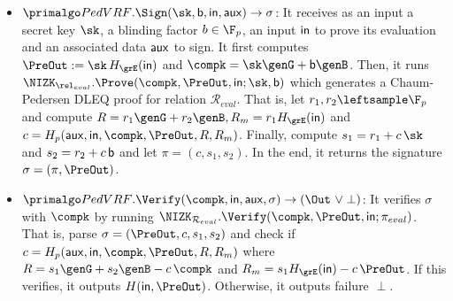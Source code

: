 \begin{itemize}
	\item $\PedVRF.\Sign(\sk,\openpk,\msg,\aux) \rightarrow \sigma$: It receives as an input a secret key $ \sk $, a blinding factor $ b \in \F_p $, an input $ \mathsf{in} $ to prove its evaluation and an associated data $ \mathsf{aux} $ to sign.
	It first computes $\PreOut := \sk \, H_{\grE}(\msg)$ and $ \compk = \sk \genG + \openpk\genB $. Then, it runs $\NIZK_{\rel_{eval}}.\Prove(\compk, \PreOut, \msg;\sk,\openpk)  $ which generates a Chaum-Pedersen DLEQ proof
	for relation $\mathcal{R}_{eval}$. That is,
	let $r_1,r_2 \leftsample \F_p$
	and compute $R = r_1 \genG + r_2 \genB, R_m = r_1 H_{\grE}(\msg) $ and $c = H_p(\aux,\msg,\compk,\PreOut,R,R_m)$. Finally, compute $s_1 = r_1 + c \, \sk$ and $s_2 = r_2 + c \, \mathsf{b}$ and let $ \pi = (c,s_1,s_2) $.
	In the end, it returns the signature $\sigma = (\pi, \PreOut) $.
	
	\item $\PedVRF.\Verify(\compk,\msg,\aux,\sigma) \rightarrow (\Out \ \vee \perp)$: 
	It verifies $ \sigma $ with  $ \compk $ by running  $ \NIZK_{\mathcal{R}_{eval}}.\Verify(\compk,\PreOut,\msg; \pi_{eval} ) $.
	That is,
	parse $\sigma = (\PreOut,c,s_1,s_2) $ and check if  
	$c = H_p(\aux,\msg,\compk,\PreOut,R,R_m)$ where  $ R = s_1 \genG + s_2 \genB - c \, \compk$ 
	and $ R_m = s_1 H_{\grE}(\msg) - c \, \PreOut$.
	If this verifies, it outputs $H(\msg,\PreOut)$. Otherwise, it outputs failure $\perp$.
\end{itemize}






